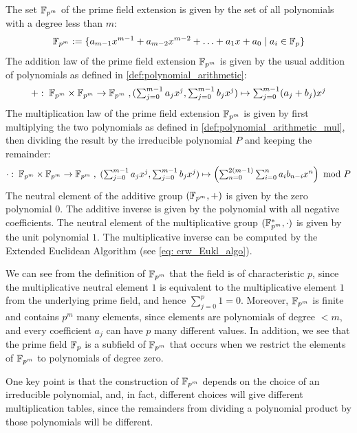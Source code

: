The set $\mathbb{F}_{p^m}$ of the prime field extension is given by the set of all polynomials with a degree less than $m$:
\begin{equation}
\label{eq:prime-extension-field}
\mathbb{F}_{p^m}:= \{a_{m-1} x^{m-1}+a_{m-2}x^{m-2}+\ldots+a_1 x+a_0\;|\; a_i\in \mathbb{F}_p\}
\end{equation}
The addition law of the prime field extension $\mathbb{F}_{p^m}$ is given by the usual addition of polynomials as defined in \eqref{def:polynomial_arithmetic}: 
\begin{equation}
+:\; \mathbb{F}_{p^m}\times \mathbb{F}_{p^m} \to \mathbb{F}_{p^m}\; , \textstyle (\sum_{j=0}^{m-1} a_j x^j,\sum_{j=0}^{m-1} b_j x^j)\mapsto \sum_{j=0}^{m-1} (a_j+b_j) x^j
\end{equation}
The multiplication law of the prime field extension $\mathbb{F}_{p^m}$ is given by first multiplying the two polynomials as defined in \eqref{def:polynomial_arithmetic_mul},  then dividing the result by the irreducible polynomial $P$ and keeping the remainder:
\begin{equation}
\cdot : \; \mathbb{F}_{p^m}\times \mathbb{F}_{p^m} \to \mathbb{F}_{p^m}\; , \textstyle\; (\sum_{j=0}^{m-1} a_j x^j,\sum_{j=0}^{m-1} b_j x^j)\mapsto \left(\sum _{n = 0} ^{2(m-1)} \sum _{i = 0} ^{n}{a} _{i }{{b} _{n-i}}{x} ^{n}\right) \text{ mod } P
\end{equation}
The neutral element of the additive group $(\mathbb{F}_{p^m},+)$ is given by the zero polynomial $0$. The additive inverse is given by the polynomial with all negative coefficients. The neutral element of the multiplicative group $(\mathbb{F}^*_{p^m},\cdot)$ is given by the unit polynomial $1$. The multiplicative inverse can be computed by the Extended Euclidean Algorithm (see \ref{eq: erw_Eukl_algo}).

We can see from the definition of $\mathbb{F}_{p^m}$ that the field is of characteristic $p$, since the multiplicative neutral element $1$ is equivalent to the multiplicative element $1$ from the underlying prime field, and hence $\sum_{j=0}^p 1=0$. Moreover, $\mathbb{F}_{p^m}$ is finite and contains $p^m$ many elements, since elements are polynomials of degree $<m$, and every coefficient $a_j$ can have $p$ many different values. In addition, we see that the prime field $\mathbb{F}_p$ is a subfield of $\mathbb{F}_{p^m}$ that occurs when we restrict the elements of $\mathbb{F}_{p^m}$ to polynomials of degree zero.

One key point is that the construction of $\mathbb{F}_{p^m}$ depends on the choice of an irreducible polynomial, and, in fact, different choices will give different multiplication tables, since the remainders from dividing a polynomial product by those polynomials will be different.

